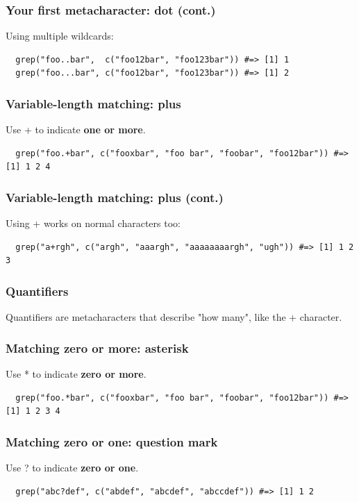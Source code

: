 \documentclass{beamer}
\begin{document}
\begin{frame}[fragile]
  \frametitle{Your first metacharacter: dot (cont.)}
  Using multiple wildcards:
  \vspace{3mm}

\begin{verbatim}
  grep("foo..bar",  c("foo12bar", "foo123bar")) #=> [1] 1
  grep("foo...bar", c("foo12bar", "foo123bar")) #=> [1] 2
\end{verbatim}
\end{frame}
\begin{frame}[fragile]
  \frametitle{Variable-length matching: plus}
  Use + to indicate \textbf{one or more}.
  \vspace{3mm}

\begin{verbatim}
  grep("foo.+bar", c("fooxbar", "foo bar", "foobar", "foo12bar")) #=> [1] 1 2 4
\end{verbatim}
\end{frame}
\begin{frame}[fragile]
  \frametitle{Variable-length matching: plus (cont.)}
  Using + works on normal characters too:
  \vspace{3mm}

\begin{verbatim}
  grep("a+rgh", c("argh", "aaargh", "aaaaaaaargh", "ugh")) #=> [1] 1 2 3
\end{verbatim}
\end{frame}
\begin{frame}
  \frametitle{Quantifiers}
  Quantifiers are metacharacters that describe "how many", like the + character.
\end{frame}
\begin{frame}[fragile]
  \frametitle{Matching zero or more: asterisk}
  Use * to indicate \textbf{zero or more}.
  \vspace{3mm}

\begin{verbatim}
  grep("foo.*bar", c("fooxbar", "foo bar", "foobar", "foo12bar")) #=> [1] 1 2 3 4
\end{verbatim}
\end{frame}
\begin{frame}[fragile]
  \frametitle{Matching zero or one: question mark}
  Use ? to indicate \textbf{zero or one}.
  \vspace{3mm}

\begin{verbatim}
  grep("abc?def", c("abdef", "abcdef", "abccdef")) #=> [1] 1 2
\end{verbatim}
\end{frame}
\end{document}
